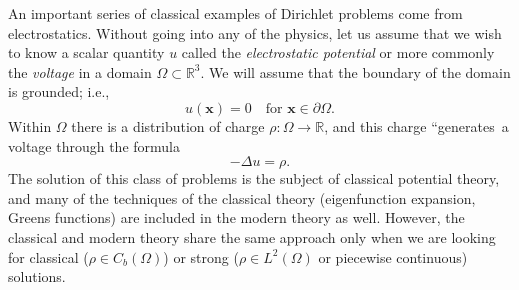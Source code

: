 \begin{Example}
\label{ex:electrostatic-surface-charge-weak-solution}
An important series of classical examples of Dirichlet problems come from electrostatics. Without going into any of the physics, let us assume that we wish to know a scalar quantity $u$ called the \emph{electrostatic potential} or more commonly the \emph{voltage} in a domain $\Omega\subset\mathbb{R}^3$. We will assume that the boundary of the domain is grounded; i.e.,
\begin{equation}\label{eq:electrostatic-grounded-dirichlet-boundary}
u(\bm{x})=0\quad\text{for }\bm{x}\in\partial\Omega.
\end{equation}
Within $\Omega$ there is a distribution of charge $\rho:\Omega\to\mathbb{R}$, and this charge ``generates\textquotesingle\textquotesingle\ a voltage through the formula
\begin{equation}\label{eq:electrostatic-charge-poisson-equation}
-\Delta u=\rho.
\end{equation}
The solution of this class of problems is the subject of classical potential theory, and many of the techniques of the classical theory (eigenfunction expansion, Green\textquotesingle s functions) are included in the modern theory as well. However, the classical and modern theory share the same approach only when we are looking for classical ($\rho\in C_b(\Omega)$) or strong ($\rho\in L^2(\Omega)$ or piecewise continuous) solutions.


\end{Example}
